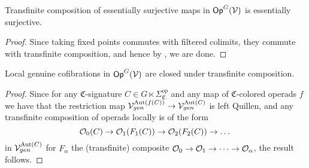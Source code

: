 \documentclass[a4paper,10pt
,draft
]{article}%
\renewcommand{\1}{\eta}%
\newcommand{\SC}{\Sigma_{\mathfrak C}}
\begin{document}
\begin{lemma}
      \label{TRANSCOMP_ES_LEM}
      Transfinite composition of essentially surjective maps in $\mathsf{Op}^G(\mathcal V)$ is essentially surjective.
\end{lemma}
\begin{proof}
      Since taking fixed points commutes with filtered colimits, they commute with transfinite composition,
      and hence by \cite[4.17]{Cav}, we are done.
\end{proof}

\begin{lemma}
      \label{TRANSCOMP_LGC_LEM}
      Local genuine cofibrations in $\mathsf{Op}^G(\mathcal V)$ are closed under transfinite composition.
\end{lemma}

\begin{proof}
      Since for any $\mathfrak C$-signature $C \in G \ltimes \SC^{op}$ and any map of $\mathfrak C$-colored operads $f$ we have that
      the restriction map
      $\mathcal V^{\operatorname{Aut}(f(C))}_{gen} \to \mathcal V^{\operatorname{Aut}(C)}_{gen}$
      is left Quillen,
      and any transfinite composition of operads locally is of the form
      \begin{equation}
            \mathcal{O}_0(C) \to \mathcal{O}_1(F_1(C)) \to \mathcal{O}_2(F_2(C)) \to \dots   
      \end{equation}
      in $\mathcal V^{\operatorname{Aut}(C)}_{gen}$
      for $F_\alpha$ the (transfinite) composite $\mathcal{O}_0 \to \mathcal{O}_1 \to \dots \to \mathcal{O}_\alpha$,
      the result follows.
\end{proof}
\end{document}
